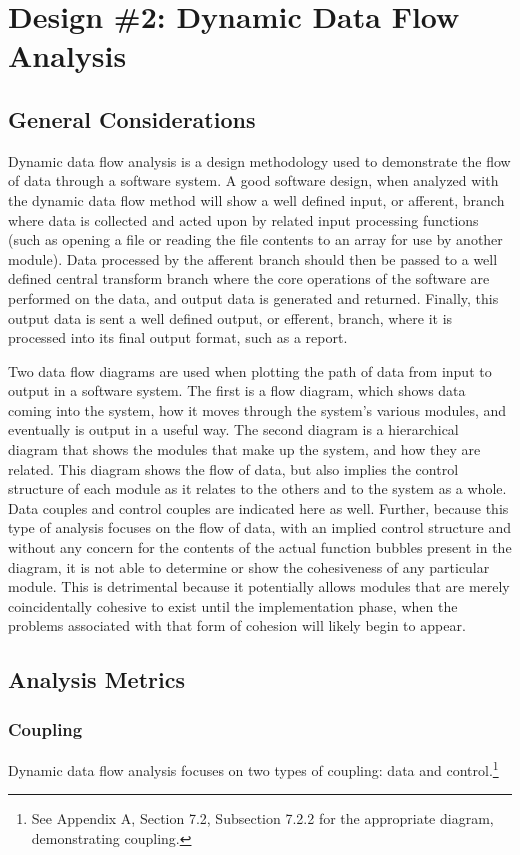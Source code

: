 \documentclass{article}
\begin{document}
\section{Design \#2: Dynamic Data Flow Analysis}
	\subsection{General Considerations}
		Dynamic data flow analysis is a design methodology used to demonstrate the flow of data through a software system. A good software design, when analyzed with the dynamic data flow method will show a well defined input, or afferent, branch where data is collected and acted upon by related input processing functions (such as opening a file or reading the file contents to an array for use by another module). Data processed by the afferent branch should then be passed to a well defined central transform branch where the core operations of the software are performed on the data, and output data is generated and returned. Finally, this output data is sent a well defined output, or efferent, branch, where it is processed into its final output format, such as a report. 
	
		Two data flow diagrams are used when plotting the path of data from input to output in a software system. The first is a flow diagram, which shows data coming into the system, how it moves through the system's various modules, and eventually is output in a useful way. The second diagram is a hierarchical diagram that shows the modules that make up the system, and how they are related. This diagram shows the flow of data, but also implies the control structure of each module as it relates to the others and to the system as a whole. Data couples and control couples are indicated here as well. Further, because this type of analysis focuses on the flow of data, with an implied control structure and without any concern for the contents of the actual function bubbles present in the diagram, it is not able to determine or show the cohesiveness of any particular module. This is detrimental because it potentially allows modules that are merely coincidentally cohesive to exist until the implementation phase, when the problems associated with that form of cohesion will likely begin to appear. 
	\subsection{Analysis Metrics}
		\subsubsection{Coupling}
			Dynamic data flow analysis focuses on two types of coupling: data and control.\footnote{See Appendix A, Section 7.2, Subsection 7.2.2 for the appropriate diagram, demonstrating coupling.} 
\end{document}
